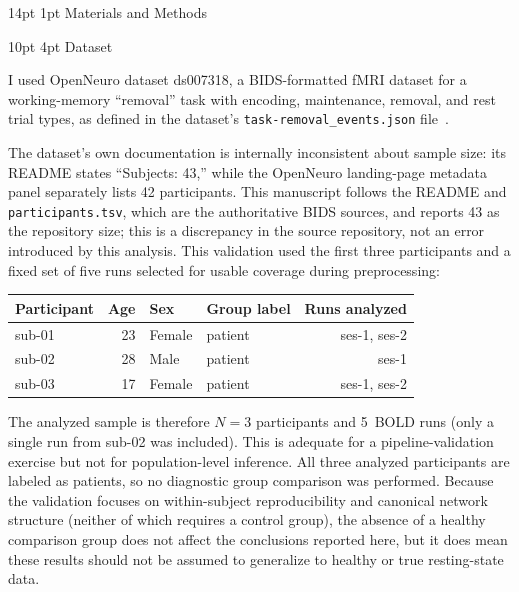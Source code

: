 \documentclass[12pt]{article}
\makeatletter
\renewcommand\section{%
  \@startsection{section}{1}{\z@}%
    {14pt \@plus 4pt \@minus 2pt}%
    {1pt}%
    {\normalfont\large\bfseries\color{black}}}
\renewcommand\subsection{%
  \@startsection{subsection}{2}{\z@}%
    {10pt \@plus 2pt \@minus 1pt}%
    {4pt}%
    {\normalfont\normalsize\bfseries}}
\makeatother
\begin{document}
\section{Materials and Methods}

\subsection{Dataset}

I used OpenNeuro dataset ds007318, a BIDS-formatted fMRI dataset for a
working-memory ``removal'' task with encoding, maintenance, removal,
and rest trial types, as defined in the dataset's
\texttt{task-removal\_events.json}
file~\citep{wang2026ds007318}.

The dataset's own documentation is internally inconsistent about sample
size: its README states ``Subjects: 43,'' while the OpenNeuro
landing-page metadata panel separately lists 42 participants. This
manuscript follows the README and \texttt{participants.tsv}, which are
the authoritative BIDS sources, and reports 43 as the repository size;
this is a discrepancy in the source repository, not an error introduced
by this analysis. This validation used the first three participants and
a fixed set of five runs selected for usable coverage during
preprocessing:

\begin{table}[h]
\centering
\small
\begin{tabular}{lrllr}
\toprule
\textbf{Participant} & \textbf{Age} & \textbf{Sex} &
  \textbf{Group label} & \textbf{Runs analyzed} \\
\midrule
sub-01 & 23 & Female & patient & ses-1, ses-2 \\
sub-02 & 28 & Male   & patient & ses-1 \\
sub-03 & 17 & Female & patient & ses-1, ses-2 \\
\bottomrule
\end{tabular}
\end{table}

The analyzed sample is therefore $N = 3$ participants and 5~BOLD runs
(only a single run from sub-02 was included). This is
adequate for a pipeline-validation exercise but not for
population-level inference. All three analyzed participants are labeled
as patients, so no diagnostic group comparison was performed. Because
the validation focuses on within-subject reproducibility and canonical
network structure (neither of which requires a control group), the
absence of a healthy comparison group does not affect the conclusions
reported here, but it does mean these results should not be assumed to
generalize to healthy or true resting-state data.
\end{document}
